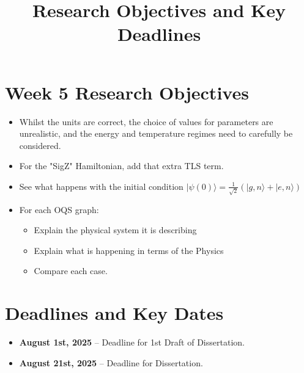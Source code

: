 \documentclass[12pt]{article}
\title{Research Objectives and Key Deadlines}
\begin{document}
\maketitle

\section*{Week 5 Research Objectives}

\begin{itemize}[leftmargin=1.5em]
    \item Whilst the units are correct, the choice of values for parameters are unrealistic, and the energy and temperature regimes need to carefully be considered. 
    \item For the "SigZ" Hamiltonian, add that extra TLS term. 
    \item See what happens with the initial condition $|\psi(0)\rangle = \frac{1}{\sqrt{2}}(|g,n\rangle + |e,n\rangle)$
    \item For each OQS graph:
    \begin{itemize}
        \item Explain the physical system it is describing
        \item Explain what is happening in terms of the Physics
        \item Compare each case.
    \end{itemize}
    
\end{itemize}

\vspace{0.5cm}

\section*{Deadlines and Key Dates}

\begin{itemize}[leftmargin=1.5em]
    \item \textbf{August 1st, 2025} -- Deadline for 1st Draft of Dissertation. 
    \item \textbf{August 21st, 2025} -- Deadline for Dissertation.
\end{itemize}
\end{document}
